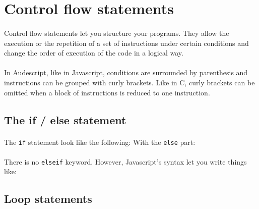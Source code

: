\documentclass{article}
\begin{document}
\begin{sloppypar}
   




\section{ Control flow statements}


\paragraph{}
Control flow statements let you structure your programs. They allow the execution or the repetition of a set of instructions under certain conditions and change the order of execution of the code in a logical way.

   
\paragraph{}
In Audescript, like in Javascript, conditions are surrounded by parenthesis and instructions can be grouped with curly brackets.
   Like in C, curly brackets can be omitted when a block of instructions is reduced to one instruction.

   

\subsection{ The if / else statement}


\paragraph{}
The \verb!if! statement look like the following:
      {}
      With the \verb!else! part:
      {}

      
\paragraph{}
There is no \verb!elseif! keyword. However, Javascript's syntax let you write things like:
      {}
   
   
   

\subsection{ Loop statements}




\end{sloppypar}
\end{document}
